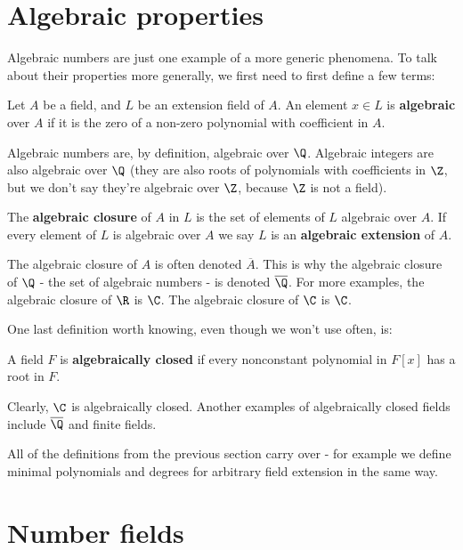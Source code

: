 \section{Algebraic properties}

\noindent Algebraic numbers are just one example of a more generic phenomena. To talk about their properties more generally, we first need to first define a few terms:

\begin{df}
    Let $A$ be a field, and $L$ be an extension field of $A$. An element $x \in L$ is \textbf{algebraic} over $A$ if it is the zero of a non-zero polynomial with coefficient in $A$.
\end{df}

\begin{ex}
    Algebraic numbers are, by definition, algebraic over $\Q$. Algebraic integers are also algebraic over $\Q$ (they are also roots of polynomials with coefficients in $\Z$, but we don't say they're algebraic over $\Z$, because $\Z$ is not a field).
\end{ex}

\begin{df}
    The \textbf{algebraic closure} of $A$ in $L$ is the set of elements of $L$ algebraic over $A$. If every element of $L$ is algebraic over $A$ we say $L$ is an \textbf{algebraic extension} of $A$.
\end{df}

\noindent The algebraic closure of $A$ is often denoted $\overline{A}$. This is why the algebraic closure of $\Q$ - the set of algebraic numbers - is denoted $\overline\Q$.
For more examples, the algebraic closure of $\R$ is $\C$. The algebraic closure of $\C$ is $\C$.

\noindent One last definition worth knowing, even though we won't use often, is:

\begin{df}
    A field $F$ is \textbf{algebraically closed} if every nonconstant polynomial in $F[x]$ has a root in $F$.
\end{df}

Clearly, $\C$ is algebraically closed. Another examples of algebraically closed fields include $\overline\Q$ and finite fields.

All of the definitions from the previous section carry over - for example we define minimal polynomials and degrees for arbitrary field extension in the same way. 

\section{Number fields}

